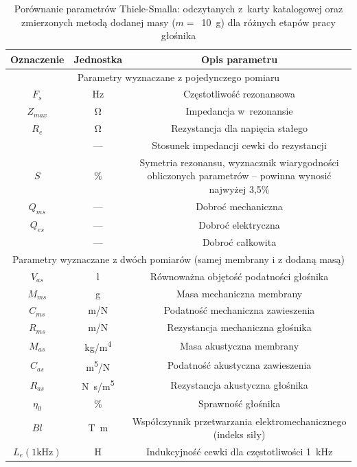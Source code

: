 \documentclass[12pt]{oska}
\begin{document}
			\begin{table}[H]
				\centering
				\caption{Porównanie parametrów Thiele-Smalla: odczytanych z~karty katalogowej oraz zmierzonych metodą dodanej masy ($m=$~\SI{10}{\gram}) dla różnych etapów pracy głośnika}
				\label{t:TS_opis}
				\begin{tabular}{|c|c|c|}
				\hline
					\textbf{Oznaczenie} & \textbf{Jednostka} & \textbf{Opis parametru}\\\hline\hline
					\multicolumn{3}{|c|}{Parametry wyznaczane z pojedynczego pomiaru} \\\hline\hline
					$F_s$ & \si{\hertz} & Częstotliwość rezonansowa \\\hline
					$Z_{max}$ & \si{\ohm} & Impedancja w~rezonansie \\\hline
					$R_e$ & \si{\ohm} & Rezystancja dla napięcia stałego \\\hline
					\gape{$r_0=\frac{Z_{max}}{R_e}$} & --- & Stosunek impedancji cewki do rezystancji \\\hline
					$S$ & \% & \makecell{Symetria rezonansu, wyznacznik wiarygodności\\obliczonych parametrów -- powinna wynosić najwyżej 3,5\%} \\\hline
					\hline
					$Q_{ms}$ & --- & Dobroć mechaniczna \\\hline
					$Q_{es}$ & --- & Dobroć elektryczna \\\hline
					\gape{$Q_{ts}=\frac{Q_{ms}\cdot Q_{es}}{Q_{ms}+Q_{es}}$} & --- & Dobroć całkowita \\\hline
					\hline
					\multicolumn{3}{|c|}{Parametry wyznaczane z dwóch pomiarów (samej membrany i z dodaną masą)} \\\hline\hline
					$V_{as}$ & \si{\litre} & Równoważna objętość podatności głośnika \\\hline
					$M_{ms}$ & \si{\gram} & Masa mechaniczna membrany \\\hline
					$C_{ms}$ & \si[per-mode=symbol]{\metre\per\newton} & Podatność mechaniczna zawieszenia \\\hline
					$R_{ms}$ & \si[per-mode=symbol]{\metre\per\newton} & Rezystancja mechaniczna głośnika \\\hline
					\hline
					$M_{as}$ & \si[per-mode=symbol]{\kilo\gram\per\metre\tothe{4}} & Masa akustyczna membrany \\\hline
					$C_{as}$ & \si[per-mode=symbol]{\metre\tothe{5}\per\newton} & Podatność akustyczna zawieszenia \\\hline
					$R_{as}$ & \si[per-mode=symbol]{\newton\s\per\metre\tothe{5}} & Rezystancja akustyczna głośnika \\\hline
					\hline
					$\eta_0$ & \% & Sprawność głośnika \\\hline
					$Bl$ & \si{\tesla\metre} & \makecell{Współczynnik przetwarzania elektromechanicznego\\(indeks siły)} \\\hline
					$L_{e} (1\si{\kilo\hertz})$ & \si{\henry} & Indukcyjność cewki dla częstotliwości \SI{1}{\kilo\hertz} \\\hline
				\end{tabular}
			\end{table}
\end{document}
